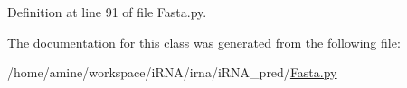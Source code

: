 \-Definition at line 91 of file \-Fasta.\-py.



\-The documentation for this class was generated from the following file\-:\begin{DoxyCompactItemize}
\item 
/home/amine/workspace/i\-R\-N\-A/irna/i\-R\-N\-A\-\_\-pred/\hyperlink{Fasta_8py}{\-Fasta.\-py}\end{DoxyCompactItemize}
